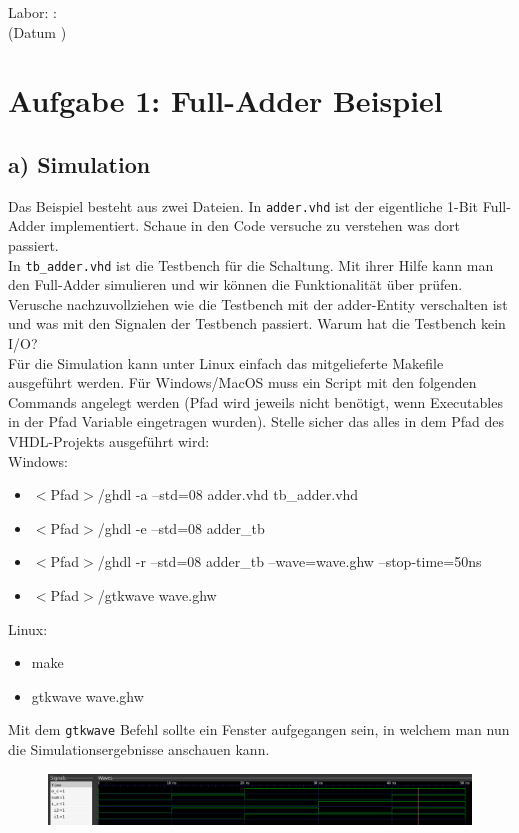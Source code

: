 \documentclass[a4paper]{scrartcl}
\def\header#1#2{
  \begin{center}
    {\Large Labor: #1: \TOPIC}\\
    {(Datum #2)}
  \end{center}
}
\begin{document}
\header{ \NUMBER}{\DATE}


\section*{Aufgabe 1: Full-Adder Beispiel}
\subsection*{a) Simulation}
Das Beispiel besteht aus zwei Dateien. In \texttt{adder.vhd} ist der eigentliche 1-Bit Full-Adder implementiert. 
Schaue in den Code versuche zu verstehen was dort passiert. \\
In \texttt{tb\_adder.vhd} ist die Testbench für die Schaltung. Mit ihrer Hilfe kann man den Full-Adder simulieren und wir können die Funktionalität über prüfen.
Verusche nachzuvollziehen wie die Testbench mit der adder-Entity verschalten ist und was mit den Signalen der Testbench passiert. Warum hat die Testbench kein I/O?\\

Für die Simulation kann unter Linux einfach das mitgelieferte Makefile ausgeführt werden. Für Windows/MacOS muss ein Script mit den folgenden Commands angelegt werden (Pfad 
wird jeweils nicht benötigt, wenn Executables in der Pfad Variable eingetragen wurden). Stelle sicher das alles in dem Pfad des VHDL-Projekts ausgeführt wird:\\
Windows:
\begin{itemize}
  \item $<$Pfad$>$/ghdl -a --std=08 adder.vhd tb\_adder.vhd
	\item $<$Pfad$>$/ghdl -e --std=08 adder\_tb
	\item $<$Pfad$>$/ghdl -r --std=08 adder\_tb --wave=wave.ghw --stop-time=50ns
	\item $<$Pfad$>$/gtkwave wave.ghw
\end{itemize}
Linux:
\begin{itemize}
  \item make
	\item gtkwave wave.ghw
\end{itemize}

Mit dem \texttt{gtkwave} Befehl sollte ein Fenster aufgegangen sein, in welchem man nun die Simulationsergebnisse anschauen kann.
\begin{figure}[h]
  \includegraphics[width=\textwidth]{gtkwave.png}
\end{figure}
\end{document}
